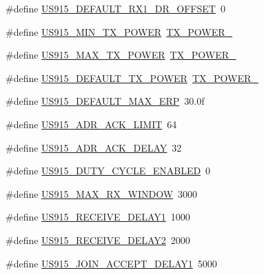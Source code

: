 \begin{DoxyCompactItemize}
\item 
\#define \mbox{\hyperlink{group___r_e_g_i_o_n_u_s915_ga84622bf421ab1e647c7b728013521baf}{U\+S915\+\_\+\+D\+E\+F\+A\+U\+L\+T\+\_\+\+R\+X1\+\_\+\+D\+R\+\_\+\+O\+F\+F\+S\+ET}}~0
\item 
\#define \mbox{\hyperlink{group___r_e_g_i_o_n_u_s915_ga7043556b6107cc2ca3f1275ee94dbb66}{U\+S915\+\_\+\+M\+I\+N\+\_\+\+T\+X\+\_\+\+P\+O\+W\+ER}}~\mbox{\hyperlink{group___r_e_g_i_o_n_gac9747c69350f34d485c3134e5a57655b}{T\+X\+\_\+\+P\+O\+W\+E\+R\+\_}}
\item 
\#define \mbox{\hyperlink{group___r_e_g_i_o_n_u_s915_gaa43b92e4e5cf26691dda96f7c4969c25}{U\+S915\+\_\+\+M\+A\+X\+\_\+\+T\+X\+\_\+\+P\+O\+W\+ER}}~\mbox{\hyperlink{group___r_e_g_i_o_n_gab33618449f2a573142c463ab071ef8ed}{T\+X\+\_\+\+P\+O\+W\+E\+R\+\_}}
\item 
\#define \mbox{\hyperlink{group___r_e_g_i_o_n_u_s915_ga45523843f3ddf11f06daa7f0b306659c}{U\+S915\+\_\+\+D\+E\+F\+A\+U\+L\+T\+\_\+\+T\+X\+\_\+\+P\+O\+W\+ER}}~\mbox{\hyperlink{group___r_e_g_i_o_n_gab33618449f2a573142c463ab071ef8ed}{T\+X\+\_\+\+P\+O\+W\+E\+R\+\_}}
\item 
\#define \mbox{\hyperlink{group___r_e_g_i_o_n_u_s915_gaf7ef0a7e48f12d53dc02e371cd136934}{U\+S915\+\_\+\+D\+E\+F\+A\+U\+L\+T\+\_\+\+M\+A\+X\+\_\+\+E\+RP}}~30.\+0f
\item 
\#define \mbox{\hyperlink{group___r_e_g_i_o_n_u_s915_ga46682acd6e4eb5f39516361bdec8e4e7}{U\+S915\+\_\+\+A\+D\+R\+\_\+\+A\+C\+K\+\_\+\+L\+I\+M\+IT}}~64
\item 
\#define \mbox{\hyperlink{group___r_e_g_i_o_n_u_s915_gac7ffa998cf39a8f85c022b4467dfac53}{U\+S915\+\_\+\+A\+D\+R\+\_\+\+A\+C\+K\+\_\+\+D\+E\+L\+AY}}~32
\item 
\#define \mbox{\hyperlink{group___r_e_g_i_o_n_u_s915_ga18f2e3af9cd1115d71597a3250f0e8ee}{U\+S915\+\_\+\+D\+U\+T\+Y\+\_\+\+C\+Y\+C\+L\+E\+\_\+\+E\+N\+A\+B\+L\+ED}}~0
\item 
\#define \mbox{\hyperlink{group___r_e_g_i_o_n_u_s915_gaa2234c0c26fa010e6219ee81c51cf36f}{U\+S915\+\_\+\+M\+A\+X\+\_\+\+R\+X\+\_\+\+W\+I\+N\+D\+OW}}~3000
\item 
\#define \mbox{\hyperlink{group___r_e_g_i_o_n_u_s915_gab1669f54e93ff0e995a5ebf186ed2fb7}{U\+S915\+\_\+\+R\+E\+C\+E\+I\+V\+E\+\_\+\+D\+E\+L\+A\+Y1}}~1000
\item 
\#define \mbox{\hyperlink{group___r_e_g_i_o_n_u_s915_ga5844c7df39049cc6fe3926967de6670f}{U\+S915\+\_\+\+R\+E\+C\+E\+I\+V\+E\+\_\+\+D\+E\+L\+A\+Y2}}~2000
\item 
\#define \mbox{\hyperlink{group___r_e_g_i_o_n_u_s915_gad282ec44fff6d4b6136a7663529e7b75}{U\+S915\+\_\+\+J\+O\+I\+N\+\_\+\+A\+C\+C\+E\+P\+T\+\_\+\+D\+E\+L\+A\+Y1}}~5000

\end{DoxyCompactItemize}
